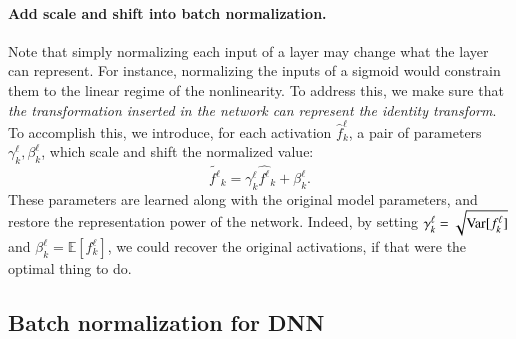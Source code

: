 \paragraph{Add scale and shift into batch normalization.}
Note that simply normalizing each input of a layer may change what the
layer can represent. For instance, normalizing the inputs of a
sigmoid would constrain them to the linear
regime of the nonlinearity. To address this, we make sure that {\em the transformation inserted in
	the network can represent the identity transform}.  To
accomplish this, we introduce, for each activation $\hat f^\ell_k$, a pair of
parameters $\gamma^\ell_k, \beta^\ell_k$, which scale and shift the
normalized value: 
\begin{equation}
\tilde{f^\ell}_k  = \gamma^\ell_k \hat{f^\ell}_k +\beta^\ell_k.
\end{equation}
These parameters are learned along with the original model
parameters, and restore the representation power of the
network. Indeed, by setting $\gamma^\ell_k = \sqrt{{\rm Var}[f^\ell_k]}$ and
$\beta^\ell_k = \mathbb E [f^\ell_k]$, we could recover the original activations, if that were the optimal thing to do.



\subsection{Batch normalization for DNN}
